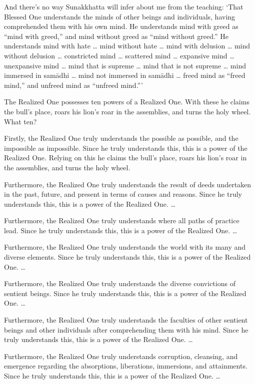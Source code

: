 \documentclass[12pt,openany]{book}%
\begin{document}
And there’s no way Sunakkhatta will infer about me from the teaching: ‘That Blessed One understands the minds of other beings and individuals, having comprehended them with his own mind. He understands mind with greed as “mind with greed,” and mind without greed as “mind without greed.” He understands mind with hate … mind without hate … mind with delusion … mind without delusion … constricted mind … scattered mind … expansive mind … unexpansive mind … mind that is supreme … mind that is not supreme … mind immersed in \textsanskrit{samādhi} … mind not immersed in \textsanskrit{samādhi} … freed mind as “freed mind,” and unfreed mind as “unfreed mind.”’ 

The Realized One possesses ten powers of a Realized One. With these he claims the bull’s place, roars his lion’s roar in the assemblies, and turns the holy wheel. What ten? 

Firstly, the Realized One truly understands the possible as possible, and the impossible as impossible. Since he truly understands this, this is a power of the Realized One. Relying on this he claims the bull’s place, roars his lion’s roar in the assemblies, and turns the holy wheel. 

Furthermore, the Realized One truly understands the result of deeds undertaken in the past, future, and present in terms of causes and reasons. Since he truly understands this, this is a power of the Realized One. … 

Furthermore, the Realized One truly understands where all paths of practice lead. Since he truly understands this, this is a power of the Realized One. … 

Furthermore, the Realized One truly understands the world with its many and diverse elements. Since he truly understands this, this is a power of the Realized One. … 

Furthermore, the Realized One truly understands the diverse convictions of sentient beings. Since he truly understands this, this is a power of the Realized One. … 

Furthermore, the Realized One truly understands the faculties of other sentient beings and other individuals after comprehending them with his mind. Since he truly understands this, this is a power of the Realized One. … 

Furthermore, the Realized One truly understands corruption, cleansing, and emergence regarding the absorptions, liberations, immersions, and attainments. Since he truly understands this, this is a power of the Realized One. … 
\end{document}
